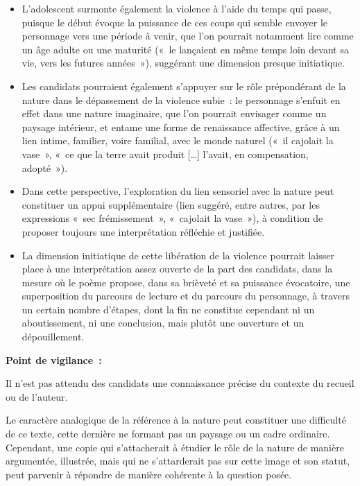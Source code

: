 {\begin{itemize}
\item L'adolescent surmonte également la violence à l'aide du temps qui passe,
puisque le début évoque la puissance de ces coups qui semble envoyer le personnage
vers une période à venir, que l'on pourrait notamment lire comme un âge adulte ou
une maturité («~le lançaient en même temps loin devant sa vie, vers les futures
années~»), suggérant une dimension presque initiatique.

\item Les candidats pourraient également s'appuyer sur le rôle prépondérant de la
nature dans le dépassement de la violence subie~: le personnage s'enfuit en effet dans
une nature imaginaire, que l'on pourrait envisager comme un paysage intérieur, et
entame une forme de renaissance affective, grâce à un lien intime, familier, voire
familial, avec le monde naturel («~il cajolait la vase~», «~ce que la terre avait produit
[…] l'avait, en compensation, adopté~»).

\item Dans cette perspective, l'exploration du lien sensoriel avec la nature peut
constituer un appui supplémentaire (lien suggéré, entre autres, par les expressions
«~sec frémissement~», «~cajolait la vase~»), à condition de proposer toujours une
interprétation réfléchie et justifiée.

\item La dimension initiatique de cette libération de la violence pourrait laisser place
à une interprétation assez ouverte de la part des candidats, dans la mesure où le
poème propose, dans sa brièveté et sa puissance évocatoire, une superposition du
parcours de lecture et du parcours du personnage, à travers un certain nombre
d'étapes, dont la fin ne constitue cependant ni un aboutissement, ni une conclusion,
mais plutôt une ouverture et un dépouillement.
\end{itemize}		

\textbf{Point de vigilance~:}

Il n'est pas attendu des candidats une connaissance précise du contexte du
recueil ou de l'auteur.

Le caractère analogique de la référence à la nature peut constituer une difficulté
de ce texte, cette dernière ne formant pas un paysage ou un cadre ordinaire.
Cependant, une copie qui s'attacherait à étudier le rôle de la nature de manière
argumentée, illustrée, mais qui ne s'attarderait pas sur cette image et son statut, peut
parvenir à répondre de manière cohérente à la question posée.
		}%
